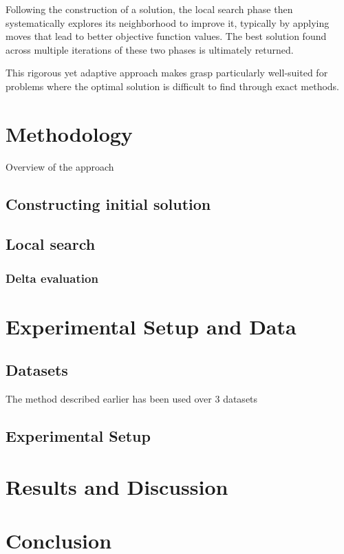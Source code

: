 \documentclass[twocolumn, switch]{article} %
\begin{document}
Following the construction of a solution, the local search phase then systematically explores its neighborhood to improve it, 
typically by applying moves that lead to better objective function values. The best solution found across multiple iterations of 
these two phases is ultimately returned. 

This rigorous yet adaptive approach makes \gls{grasp} particularly well-suited for problems where the optimal solution is difficult 
to find through exact methods.

\section{Methodology}
Overview of the approach 

\subsection{Constructing initial solution}
\lipsum[5]

\subsection{Local search}
\lipsum[6]

\subsubsection{Delta evaluation}
\lipsum[7]

\section{Experimental Setup and Data}
\lipsum[8]

\subsection{Datasets}
The method described earlier has been used over 3 datasets 

\subsection{Experimental Setup}
\lipsum[10]

\section{Results and Discussion}
\lipsum[11]

\section{Conclusion}
\lipsum[12] \cite{Cerrone}
\end{document}
